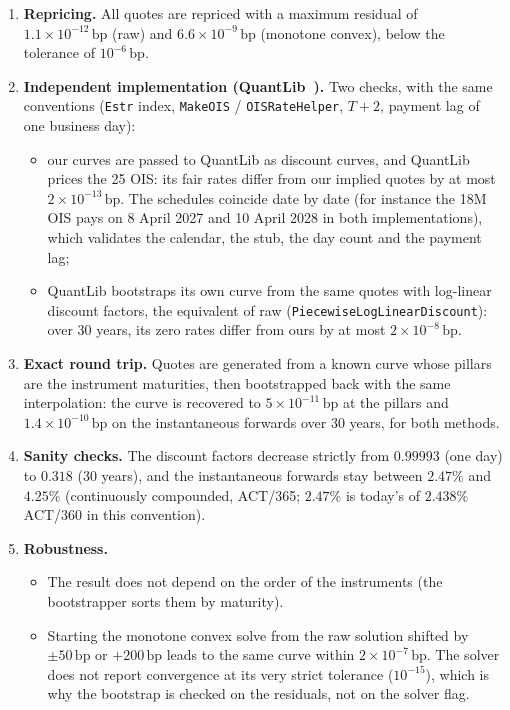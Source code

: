 \documentclass[11pt,a4paper]{article}
\theoremstyle{plain}
\theoremstyle{definition}
\newcommand{\bp}{\,\mathrm{bp}}
\newcommand{\estr}{\text{\texteuro STR}}
\begin{document}
\begin{enumerate}[label=(\arabic*)]
    \item \textbf{Repricing.} All quotes are repriced with a maximum residual of $1.1\times10^{-12}\bp$ (raw) and $6.6\times10^{-9}\bp$ (monotone convex), below the tolerance of $10^{-6}\bp$.
    \item \textbf{Independent implementation (QuantLib~\cite{quantlib}).} Two checks, with the same conventions (\texttt{Estr} index, \texttt{MakeOIS} / \texttt{OISRateHelper}, $T+2$, payment lag of one business day):
    \begin{itemize}
        \item our curves are passed to QuantLib as discount curves, and QuantLib prices the 25 OIS: its fair rates differ from our implied quotes by at most $2\times10^{-13}\bp$. The schedules coincide date by date (for instance the 18M OIS pays on 8 April 2027 and 10 April 2028 in both implementations), which validates the calendar, the stub, the day count and the payment lag;
        \item QuantLib bootstraps its own curve from the same quotes with log-linear discount factors, the equivalent of raw (\texttt{Piecewise\-Log\-Linear\-Discount}): over 30 years, its zero rates differ from ours by at most $2\times10^{-8}\bp$.
    \end{itemize}
    \item \textbf{Exact round trip.} Quotes are generated from a known curve whose pillars are the instrument maturities, then bootstrapped back with the same interpolation: the curve is recovered to $5\times10^{-11}\bp$ at the pillars and $1.4\times10^{-10}\bp$ on the instantaneous forwards over 30 years, for both methods.
    \item \textbf{Sanity checks.} The discount factors decrease strictly from $0.99993$ (one day) to $0.318$ (30 years), and the instantaneous forwards stay between $2.47\%$ and $4.25\%$ (continuously compounded, ACT/365; $2.47\%$ is today's \estr{} of $2.438\%$ ACT/360 in this convention).
    \item \textbf{Robustness.}
    \begin{itemize}
        \item The result does not depend on the order of the instruments (the bootstrapper sorts them by maturity).
        \item Starting the monotone convex solve from the raw solution shifted by $\pm50\bp$ or $+200\bp$ leads to the same curve within $2\times10^{-7}\bp$. The solver does not report convergence at its very strict tolerance ($10^{-15}$), which is why the bootstrap is checked on the residuals, not on the solver flag.

\end{itemize}
\end{enumerate}
\end{document}
